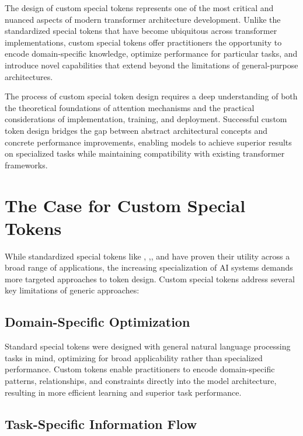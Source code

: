
The design of custom special tokens represents one of the most critical and nuanced aspects of modern transformer architecture development. Unlike the standardized special tokens that have become ubiquitous across transformer implementations, custom special tokens offer practitioners the opportunity to encode domain-specific knowledge, optimize performance for particular tasks, and introduce novel capabilities that extend beyond the limitations of general-purpose architectures.

The process of custom special token design requires a deep understanding of both the theoretical foundations of attention mechanisms and the practical considerations of implementation, training, and deployment. Successful custom token design bridges the gap between abstract architectural concepts and concrete performance improvements, enabling models to achieve superior results on specialized tasks while maintaining compatibility with existing transformer frameworks.

\section{The Case for Custom Special Tokens}

While standardized special tokens like \cls{}, \sep{}, and \mask{} have proven their utility across a broad range of applications, the increasing specialization of AI systems demands more targeted approaches to token design. Custom special tokens address several key limitations of generic approaches:

\subsection{Domain-Specific Optimization}

Standard special tokens were designed with general natural language processing tasks in mind, optimizing for broad applicability rather than specialized performance. Custom tokens enable practitioners to encode domain-specific patterns, relationships, and constraints directly into the model architecture, resulting in more efficient learning and superior task performance.

\subsection{Task-Specific Information Flow}


